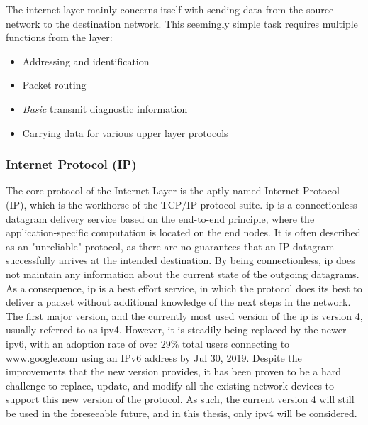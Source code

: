 The internet layer mainly concerns itself with sending data from the source
network to the destination network. This seemingly simple task requires multiple
functions from the layer:
\begin{itemize}
    \item Addressing and identification
    \item Packet routing
    \item \emph{Basic} transmit diagnostic information
    \item Carrying data for various upper layer protocols
\end{itemize}

\subsubsection{Internet Protocol (IP)}
The core protocol of the Internet Layer is the aptly named Internet Protocol
(IP), which is the workhorse of the TCP/IP protocol suite.
\gls{ip} is a connectionless datagram delivery service based on the
end-to-end principle, where the application-specific computation is located on
the end nodes. It is often described as an "unreliable" protocol, as there are
no guarantees that an IP datagram successfully arrives at the intended
destination. By being connectionless, \gls{ip} does not maintain any
information about the current state of the outgoing datagrams.
As a consequence, \gls{ip} is a best effort service, in which the protocol does
its best to deliver a packet without additional knowledge of the next steps in
the network\cite{tcpip_illustrated_vol1}.\\
The first major version, and the currently most used version of the \gls{ip}
is version 4, usually referred to as \gls{ipv4}. However, it is steadily
being replaced by the newer \gls{ipv6}, with an adoption rate of over $29\%$
total users connecting to \url{www.google.com} using an IPv6 address by Jul
30, 2019\cite{google_ipv6_adoption}. Despite the improvements that the new
version provides, it has been proven to be a hard challenge to replace, update,
and modify all the existing network devices to support this new version of the
protocol. As such, the current version 4 will still be used in the foreseeable
future, and in this thesis, only \gls{ipv4} will be considered.\\

